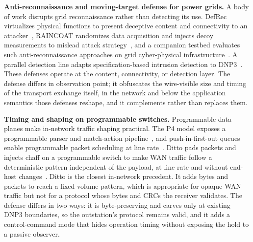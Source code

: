 \noindent\textbf{Anti-reconnaissance and moving-target defense for power grids.} A body of work
disrupts grid reconnaissance rather than detecting its use. DefRec virtualizes physical functions to
present deceptive content and connectivity to an attacker~\cite{defrec2020}, RAINCOAT randomizes data
acquisition and injects decoy measurements to mislead attack strategy~\cite{raincoat2019}, and a
companion testbed evaluates such anti-reconnaissance approaches on grid cyber-physical
infrastructure~\cite{lintestbed2020}. A parallel detection line adapts specification-based intrusion
detection to DNP3~\cite{linbro2013}. These defenses operate at the content, connectivity, or detection
layer. The defense differs in observation point; it obfuscates the wire-visible size and timing of the
transport exchange itself, in the network and below the application semantics those defenses reshape,
and it complements rather than replaces them.

\noindent\textbf{Timing and shaping on programmable switches.} Programmable data planes make in-network
traffic shaping practical. The P4 model exposes a programmable parser and match-action
pipeline~\cite{p4ccr2014}, and push-in-first-out queues enable programmable packet scheduling at line
rate~\cite{pifo2016}. Ditto pads packets and injects chaff on a programmable switch to make WAN traffic
follow a deterministic pattern independent of the payload, at line rate and without end-host
changes~\cite{ditto2022}. Ditto is the closest in-network precedent. It adds bytes and packets to reach
a fixed volume pattern, which is appropriate for opaque WAN traffic but not for a protocol whose bytes
and CRCs the receiver validates. The defense differs in two ways: it is byte-preserving and carves only
at existing DNP3 boundaries, so the outstation's protocol remains valid, and it adds a control-command
mode that hides operation timing without exposing the hold to a passive observer.
